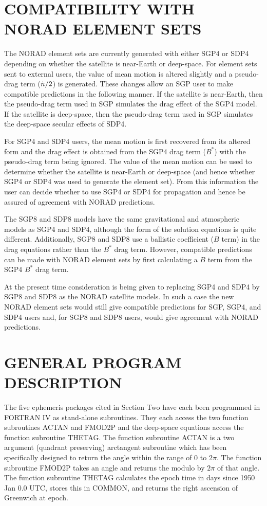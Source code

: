 \section[Compatibility with NORAD Element Sets]{COMPATIBILITY WITH NORAD ELEMENT SETS}
The NORAD element sets are currently generated with either SGP4 or SDP4
depending on whether the satellite is near-Earth or deep-space.  For element
sets sent to external users, the value of mean motion is altered slightly and
a pseudo-drag term ($\dot{n}/2$) is generated.  These changes allow an SGP user
to make compatible predictions in the following manner.  If the satellite is
near-Earth, then the pseudo-drag term used in SGP simulates the drag effect of
the SGP4 model.  If the satellite is deep-space, then the pseudo-drag term
used in SGP simulates the deep-space secular effects of SDP4.

For SGP4 and SDP4 users, the mean motion is first recovered from its altered
form and the drag effect is obtained from the SGP4 drag term ($B^*$) with the
pseudo-drag term being ignored.  The value of the mean motion can be used to
determine whether the satellite is near-Earth or deep-space (and hence whether
SGP4 or SDP4 was used to generate the element set).  From this information the
user can decide whether to use SGP4 or SDP4 for propagation and hence be
assured of agreement with NORAD predictions.

The SGP8 and SDP8 models have the same gravitational and atmospheric models as
SGP4 and SDP4, although the form of the solution equations is quite different.
Additionally, SGP8 and SDP8 use a ballistic coefficient ($B$ term) in the drag
equations rather than the $B^*$ drag term.  However, compatible predictions
can be made with NORAD element sets by first calculating a $B$ term from the
SGP4 $B^*$ drag term.

At the present time consideration is being given to replacing SGP4 and SDP4 by
SGP8 and SDP8 as the NORAD satellite models.  In such a case the new NORAD
element sets would still give compatible predictions for SGP, SGP4, and SDP4
users and, for SGP8 and SDP8 users, would give agreement with NORAD
predictions.

\section[General Program Description]{GENERAL PROGRAM DESCRIPTION}
The five ephemeris packages cited in Section Two have each been programmed in
FORTRAN IV as stand-alone subroutines.  They each access the two function
subroutines ACTAN and FMOD2P and the deep-space equations access the function
subroutine THETAG.  The function subroutine ACTAN is a two argument (quadrant
preserving) arctangent subroutine which has been specifically designed to
return the angle within the range of 0 to $2\pi$.  The function subroutine
FMOD2P takes an angle and returns the modulo by $2\pi$ of that angle.  The
function subroutine THETAG calculates the epoch time in days since 1950 Jan
0.0 UTC, stores this in COMMON, and returns the right ascension of Greenwich
at epoch.

